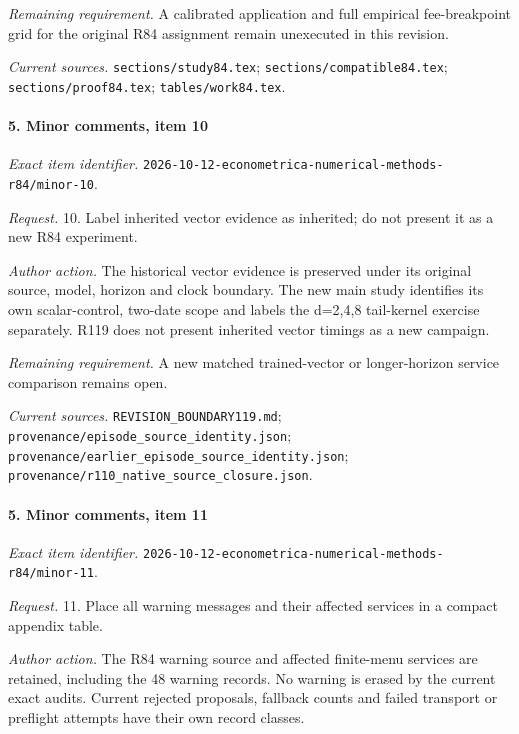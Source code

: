 \par\emph{Remaining requirement.} A calibrated application and full empirical fee-breakpoint grid for the original R84 assignment remain unexecuted in this revision.

\par\emph{Current sources.} \nolinkurl{sections/study84.tex}; \nolinkurl{sections/compatible84.tex}; \nolinkurl{sections/proof84.tex}; \nolinkurl{tables/work84.tex}.

\paragraph{5. Minor comments, item 10}

\emph{Exact item identifier.} \nolinkurl{2026-10-12-econometrica-numerical-methods-r84/minor-10}.

\par\emph{Request.} 10. Label inherited vector evidence as inherited; do not present it as a new R84 experiment.

\par\emph{Author action.} The historical vector evidence is preserved under its original source, model, horizon and clock boundary. The new main study identifies its own scalar-control, two-date scope and labels the d=2,4,8 tail-kernel exercise separately. R119 does not present inherited vector timings as a new campaign.

\par\emph{Remaining requirement.} A new matched trained-vector or longer-horizon service comparison remains open.

\par\emph{Current sources.} \nolinkurl{REVISION_BOUNDARY119.md}; \nolinkurl{provenance/episode_source_identity.json}; \nolinkurl{provenance/earlier_episode_source_identity.json}; \nolinkurl{provenance/r110_native_source_closure.json}.

\paragraph{5. Minor comments, item 11}

\emph{Exact item identifier.} \nolinkurl{2026-10-12-econometrica-numerical-methods-r84/minor-11}.

\par\emph{Request.} 11. Place all warning messages and their affected services in a compact appendix table.

\par\emph{Author action.} The R84 warning source and affected finite-menu services are retained, including the 48 warning records. No warning is erased by the current exact audits. Current rejected proposals, fallback counts and failed transport or preflight attempts have their own record classes.

